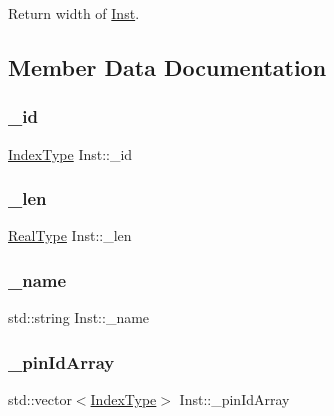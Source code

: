 Return width of \hyperlink{classInst}{Inst}. 



\subsection{Member Data Documentation}
\mbox{\label{classInst_a11c7c07b99b2a60e9637a3a1a67911e5}} 
\subsubsection{\texorpdfstring{\+\_\+id}{\_id}}
{\footnotesize\ttfamily \hyperlink{type_8h_a581e8093e28e7362f2b6937296190676}{Index\+Type} Inst\+::\+\_\+id\hspace{0.3cm}{\ttfamily [private]}}

\mbox{\label{classInst_acb3bddc4216dba958466c34fb5698adc}} 
\subsubsection{\texorpdfstring{\+\_\+len}{\_len}}
{\footnotesize\ttfamily \hyperlink{type_8h_a51898ad9e46b1265f3fab67f7d4b04a2}{Real\+Type} Inst\+::\+\_\+len\hspace{0.3cm}{\ttfamily [private]}}

\mbox{\label{classInst_a2f11b1c4d2151470182e0d24f7bddbbb}} 
\subsubsection{\texorpdfstring{\+\_\+name}{\_name}}
{\footnotesize\ttfamily std\+::string Inst\+::\+\_\+name\hspace{0.3cm}{\ttfamily [private]}}

\mbox{\label{classInst_aba5f13fac393f1f506630ef1259853b7}} 
\subsubsection{\texorpdfstring{\+\_\+pin\+Id\+Array}{\_pinIdArray}}
{\footnotesize\ttfamily std\+::vector$<$\hyperlink{type_8h_a581e8093e28e7362f2b6937296190676}{Index\+Type}$>$ Inst\+::\+\_\+pin\+Id\+Array\hspace{0.3cm}{\ttfamily [private]}}

